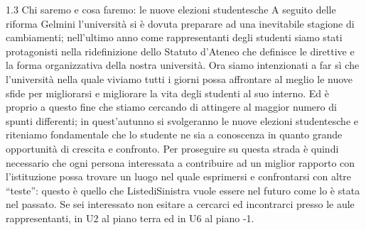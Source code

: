 1.3 Chi saremo e cosa faremo: le nuove elezioni studentesche
A seguito delle riforma Gelmini l'università si è dovuta preparare ad una inevitabile stagione di cambiamenti; nell'ultimo anno come rappresentanti degli studenti siamo stati protagonisti nella ridefinizione dello Statuto d'Ateneo che definisce le direttive e la forma organizzativa della nostra università. Ora siamo intenzionati a far sì che l'università nella quale viviamo tutti i giorni possa affrontare al meglio le nuove sfide per migliorarsi e migliorare la vita degli studenti al suo interno.
Ed è proprio a questo fine che stiamo cercando di attingere al maggior numero di spunti differenti; in quest'autunno si svolgeranno le nuove elezioni studentesche e riteniamo fondamentale che lo studente ne sia a conoscenza in quanto grande opportunità di crescita e confronto.
Per proseguire su questa strada è quindi necessario che ogni persona interessata a contribuire ad un miglior rapporto con l'istituzione possa trovare un luogo nel quale esprimersi e confrontarsi con altre “teste”: questo è quello che ListediSinistra vuole essere nel futuro come lo è stata nel passato. Se sei interessato non esitare a cercarci ed incontrarci presso le aule rappresentanti, in U2 al piano terra ed in U6 al piano -1.

